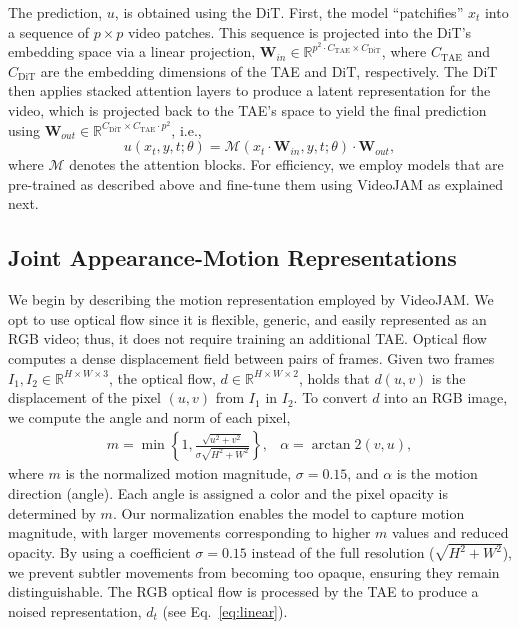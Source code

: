 The prediction, $u$, is obtained using the DiT. First, the model ``patchifies'' $x_t$ into a sequence of $p \times p$ video patches. This sequence is projected into the DiT's embedding space via a linear projection, $\textbf{W}_{in}\in \mathbb{R}^{p^2\cdot C_{\text{TAE}}\times C_{\text{DiT}}}$, where $C_{\text{TAE}}$ and $C_{\text{DiT}}$ are the embedding dimensions of the TAE and DiT, respectively. The DiT then applies stacked attention layers to produce a latent representation for the video, which is projected back to the TAE's space to yield the final prediction using $\textbf{W}_{out}\in \mathbb{R}^{C_{\text{DiT}}\times C_{\text{TAE}}\cdot p^2}$, i.e.,
\begin{equation}
   u(x_t, y, t; \theta) =  \mathcal{M}( x_t \cdot \textbf{W}_{in}, y, t; \theta) \cdot \textbf{W}_{out},
    \label{eq:output}
\end{equation}
where $\mathcal{M}$ denotes the attention blocks. 
For efficiency, we employ models that are pre-trained as described above and fine-tune them using VideoJAM as explained next. 

\vspace{-0.2cm}
\subsection{Joint Appearance-Motion Representations}
\label{sec:method_joint_rep}

We begin by describing the motion representation employed by VideoJAM. We opt to use optical flow since it is flexible, generic, and easily represented as an RGB video; thus, it does not require training an additional TAE.
Optical flow computes a dense displacement field between pairs of frames. Given two frames $I_1, I_2\in \mathbb{R}^{H\times W\times 3}$, the optical flow, $d\in \mathbb{R}^{H\times W\times 2}$, holds that $d(u,v)$ is the displacement of the pixel $(u,v)$ from $I_1$ in $I_2$. To convert $d$ into an RGB image, we compute the angle and norm of each pixel,
\begin{align}
     m = \min\left\{1,\frac{\sqrt{u^2+v^2}}{\sigma\sqrt{H^2+W^2}}\right\},  &\alpha = \arctan2(v,u),
     \label{eq:optical_flow_normalization}
\end{align}
where $m$ is the normalized motion magnitude, $\sigma=0.15$, and $\alpha$ is the motion direction (angle). Each angle is assigned a color and the pixel opacity is determined by $m$. Our normalization enables the model to capture motion magnitude, with larger movements corresponding to higher $m$ values and reduced opacity. By using a coefficient $\sigma = 0.15$ instead of the full resolution ($\sqrt{H^2+W^2}$), we prevent subtler movements from becoming too opaque, ensuring they remain distinguishable.
The RGB optical flow is processed by the TAE to produce a noised representation, $d_t$ (see Eq.~\ref{eq:linear}).

